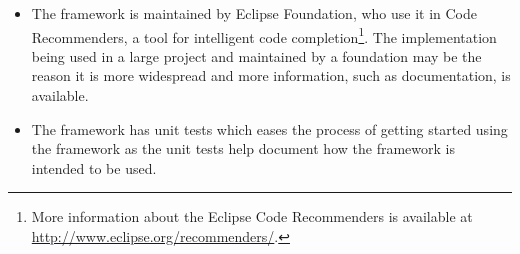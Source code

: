 \begin{itemize}
\item The framework is maintained by Eclipse Foundation, who use it in Code Recommenders, a tool for intelligent code completion\footnote{More information about the Eclipse Code Recommenders is available at \url{http://www.eclipse.org/recommenders/}.}. The implementation being used in a large project and maintained by a foundation may be the reason it is more widespread and more information, such as documentation, is available.
\item The framework  has unit tests which eases the process of getting started using the framework as the unit tests help document how the framework is intended to be used.
\end{itemize}

